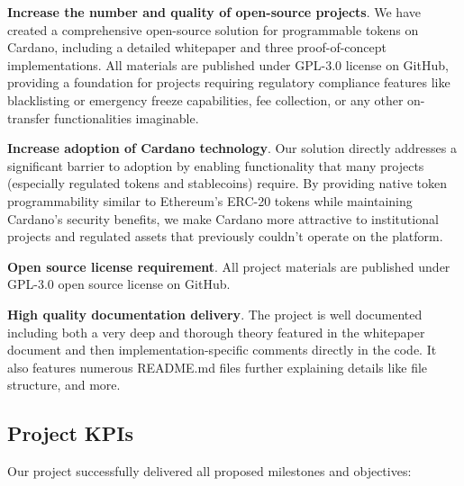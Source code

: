 \medskip{}

\noindent{}\textbf{Increase the number and quality of open-source projects}.
We have created a comprehensive open-source solution for programmable tokens on Cardano, including a detailed whitepaper and three proof-of-concept implementations. All materials are published under GPL-3.0 license on GitHub, providing a foundation for projects requiring regulatory compliance features like blacklisting or emergency freeze capabilities, fee collection, or any other on-transfer functionalities imaginable.

\medskip{}

\noindent{}\textbf{Increase adoption of Cardano technology}.
Our solution directly addresses a significant barrier to adoption by enabling functionality that many projects (especially regulated tokens and stablecoins) require. By providing native token programmability similar to Ethereum's ERC-20 tokens while maintaining Cardano's security benefits, we make Cardano more attractive to institutional projects and regulated assets that previously couldn't operate on the platform.

\medskip{}

\noindent{}\textbf{Open source license requirement}.
All project materials are published under GPL-3.0 open source license on GitHub.

\medskip{}

\noindent{}\textbf{High quality documentation delivery}.
The project is well documented including both a very deep and thorough theory featured in the whitepaper document and then implementation-specific comments directly in the code. It also features numerous README.md files further explaining details like file structure, and more.

\subsection{Project KPIs}
\noindent{}Our project successfully delivered all proposed milestones and objectives:

\medskip{}

